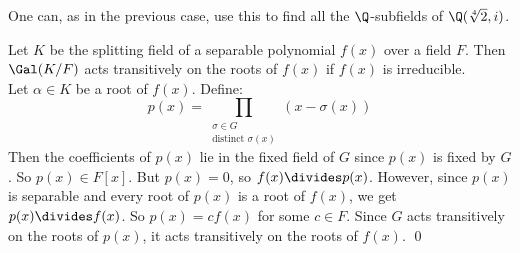 One can, as in the previous case, use this to find all the $\Q$-subfields of $\Q(\sqrt[4]{2},i)$.

\thm Let $K$ be the splitting field of a separable polynomial $f(x)$ over a field $F$.  Then $\Gal(K/F)$ acts transitively on the roots of $f(x)$ if $f(x)$ is irreducible. \\
\pf Let $\alpha\in K$ be a root of $f(x)$.  Define:
\[ p(x) = \prod_{\substack{\sigma\in G\\\text{distinct $\sigma(x)$}}}(x-\sigma(x)) \]
Then the coefficients of $p(x)$ lie in the fixed field of $G$ since $p(x)$ is fixed by $G$.  So $p(x)\in F[x]$.  But $p(x)=0$, so $f(x)\divides p(x)$.  However, since $p(x)$ is separable and every root of $p(x)$ is a root of $f(x)$, we get $p(x)\divides f(x)$.  So $p(x)=cf(x)$ for some $c\in F$.  Since $G$ acts transitively on the roots of $p(x)$, it acts transitively on the roots of $f(x)$. \qed
